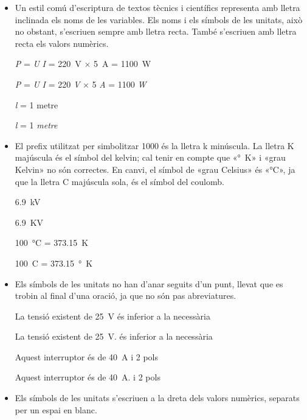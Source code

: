 \begin{itemize}

\item Un estil comú d'escriptura de textos tècnics i científics representa amb lletra inclinada els noms de les variables.
Els noms i els símbols de les unitats, això no obstant, s'escriuen sempre amb lletra recta.
També s'escriuen amb lletra recta els valors numèrics.

\textcolor{Green}\faCheckSquare{} \textit{P} = \textit{U} \textit{I} = \qty{220}{V} $\times$ \qty{5}{A} = \qty{1100}{W}

\textcolor{Red}\faTimesCircle{} \textit{P} = \textit{U} \textit{I} = 220 \textit{V} $\times$ 5 \textit{A} = 1100 \textit{W}

\textcolor{Green}\faCheckSquare{} \textit{l} = 1 metre

\textcolor{Red}\faTimesCircle{} \textit{l} = 1 \textit{metre}

\item El prefix utilitzat per simbolitzar 1000 és la lletra k minúscula.  La lletra K majúscula és el símbol del  kelvin; cal tenir en compte que «\unit{\degree K}»  i «grau Kelvin» no són correctes. En canvi, el símbol de «grau Celsius» és «\unit{\degreeCelsius}», ja que la lletra C majúscula sola, és el símbol del coulomb.

\textcolor{Green}\faCheckSquare{} \qty{6,9}{kV}

\textcolor{Red}\faTimesCircle{} \qty{6,9}{KV}

\textcolor{Green}\faCheckSquare{} \qty{100}{\degreeCelsius} = \qty{373,15}{K}

\textcolor{Red}\faTimesCircle{} \qty{100}{C} = \qty{373,15}{\degree K}


\item Els símbols de les unitats no han d'anar seguits d'un punt, llevat que es trobin al final d'una oració, ja que no són pas
abreviatures.

\textcolor{Green}\faCheckSquare{} La tensió existent de \qty{25}{V} és inferior a la necessària

\textcolor{Red}\faTimesCircle{} La tensió existent de \qty{25}{V}. és inferior a la necessària

\textcolor{Green}\faCheckSquare{}  Aquest interruptor és de \qty{40}{A} i 2 pols

\textcolor{Red}\faTimesCircle{}  Aquest interruptor és de \qty{40}{A}. i 2 pols


\item Els símbols de les unitats s'escriuen a la dreta dels valors
numèrics, separats per un espai en blanc.


\end{itemize}

